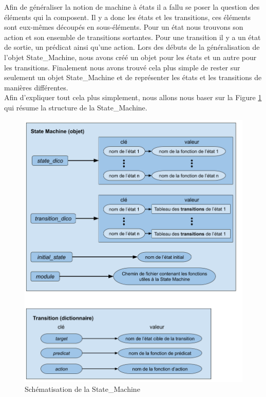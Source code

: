 \documentclass[a4paper,french]{article}
\begin{document}
Afin de généraliser la notion de machine à états il a fallu se poser la question des éléments qui la composent. Il y a donc les états et les transitions, ces éléments sont eux-mêmes découpés en sous-éléments. Pour un état nous trouvons son action et son ensemble de transitions sortantes. Pour une transition il y a un état de sortie, un prédicat ainsi qu'une action. Lors des débuts de la généralisation de l'objet State\_Machine, nous avons créé un objet pour les états et un autre pour les transitions. Finalement nous avons trouvé cela plus simple de rester sur seulement un objet State\_Machine et de représenter les états et les transitions de manières différentes. \\

Afin d'expliquer tout cela plus simplement, nous allons nous baser sur la Figure \ref{fig:statemachine} qui résume la structure de la State\_Machine. 

\begin{figure}[H]
    \centering
    \includegraphics[scale=0.45]{figures/State_Machine.png}
    \caption{Schématisation de la State\_Machine}
    \label{fig:statemachine}
\end{figure}
\end{document}
